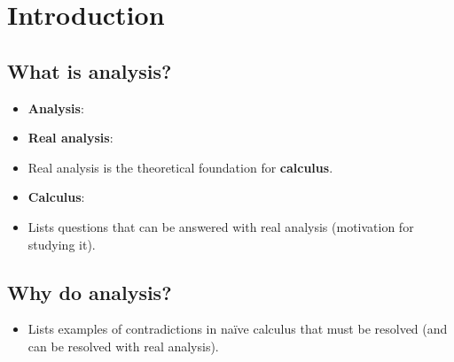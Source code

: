 \documentclass[../main.tex]{subfiles}
\begin{document}
\chapter{Introduction}
\section{What is analysis?}
\begin{itemize}
    \item {}\textbf{Analysis}: 
    \item \textbf{Real analysis}: 
    \item Real analysis is the theoretical foundation for \textbf{calculus}.
    \item \textbf{Calculus}: 
    \item Lists questions that can be answered with real analysis (motivation for studying it).
\end{itemize}



\section{Why do analysis?}
\begin{itemize}
    \item Lists examples of contradictions in na\"{i}ve calculus that must be resolved (and can be resolved with real analysis).
\end{itemize}
\end{document}
